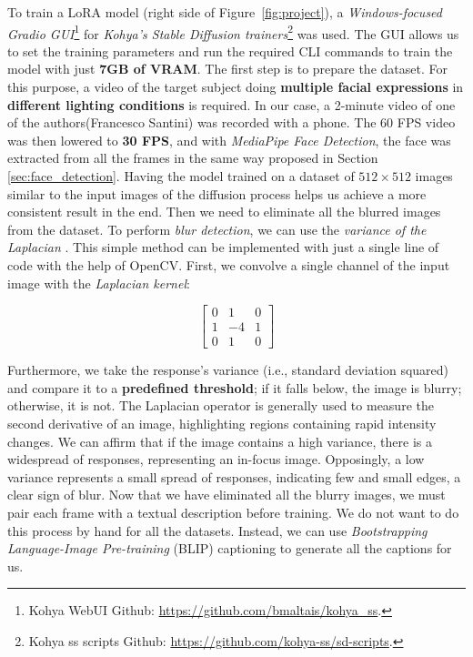 \documentclass[preprint]{elsarticle}
\begin{document}
To train a LoRA model (right side of Figure~\ref{fig:project}), a \emph{Windows-focused Gradio GUI}\footnote{Kohya WebUI Github: \url{https://github.com/bmaltais/kohya_ss}.} for \emph{Kohya's Stable Diffusion trainers}\footnote{Kohya ss scripts Github: \url{https://github.com/kohya-ss/sd-scripts}.} was used. 
The GUI allows us to set the training parameters and run the required 
CLI commands to train the model with just \textbf{7GB of VRAM}. 
The first step is to prepare the dataset. For this purpose, 
a video of the target subject doing \textbf{multiple facial expressions} in \textbf{different lighting conditions} 
is required. In our case, a 2-minute video of one of the authors(Francesco Santini) was recorded with a phone. 
The 60 FPS video was then lowered to \textbf{30 FPS}, and with \emph{MediaPipe Face Detection},
the face was extracted from all the frames in the same way proposed in Section \ref{sec:face_detection}.
Having the model trained on a dataset of $512\times 512$ images similar to the input images 
of the diffusion process helps us achieve a more consistent result in the end. 
Then we need to eliminate all the blurred images from the dataset. 
To perform \emph{blur detection}, we can use the \emph{variance of the Laplacian} \cite{903548}. 
This simple method can be implemented with just a single line of code with the help of OpenCV. 
First, we convolve a single channel of the input image with the \emph{Laplacian kernel}:

\begin{equation}
	\begin{bmatrix}
		0 & 1 & 0\\
		1 & -4 & 1\\
		0 & 1 & 0
	\end{bmatrix}
\end{equation}

Furthermore, we take the response's variance (i.e., standard deviation squared) 
and compare it to a \textbf{predefined threshold}; if it falls below, the image is blurry; otherwise, it is not.
The Laplacian operator is generally used to measure the second derivative of an image, 
highlighting regions containing rapid intensity changes. 
We can affirm that if the image contains a high variance, there is a widespread of responses, 
representing an in-focus image. Opposingly, a  low variance represents a small spread of responses, 
indicating few and small edges, a clear sign of blur.
Now that we have eliminated all the blurry images, 
we must pair each frame with a textual description before training. 
We do not want to do this process by hand for all the datasets. 
Instead, we can use \emph{Bootstrapping Language-Image Pre-training} (BLIP) captioning \cite{li2022blip} 
to generate all the captions for us. 
\end{document}
